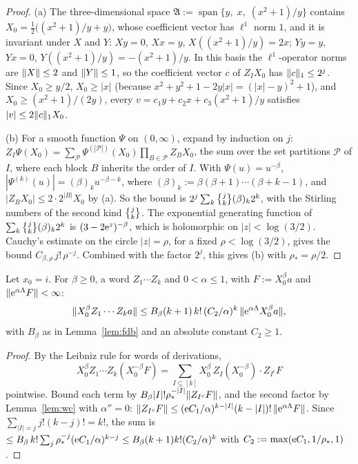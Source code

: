 \begin{proof}
(a) The three-dimensional space $\mathfrak A:=\operatorname{span}\{y,\;x,\;(x^2+1)/y\}$ contains $X_0=\tfrac12\bigl((x^2+1)/y+y\bigr)$,
whose coefficient vector has $\ell^1$ norm $1$, and it is invariant under $X$ and $Y$: $Xy=0$, $Xx=y$, $X((x^2+1)/y)=2x$; $Yy=y$,
$Yx=0$, $Y((x^2+1)/y)=-(x^2+1)/y$. In this basis the $\ell^1$-operator norms are $\lVert X\rVert\le2$ and $\lVert Y\rVert\le1$, so the coefficient
vector $c$ of $Z_IX_0$ has $\lVert c\rVert_1\le2^j$. Since $X_0\ge y/2$, $X_0\ge|x|$ (because $x^2+y^2+1-2y|x|=(|x|-y)^2+1$), and
$X_0\ge(x^2+1)/(2y)$, every $v=c_1y+c_2x+c_3(x^2+1)/y$ satisfies $|v|\le2\lVert c\rVert_1X_0$.

(b) For a smooth function $\Psi$ on $(0,\infty)$, expand by induction on $j$: $Z_I\Psi(X_0)=\sum_{\mathcal P}\Psi^{(|\mathcal P|)}(X_0)\prod_{B\in\mathcal P}Z_BX_0$, the sum over the set partitions $\mathcal P$ of $I$, where each block $B$ inherits the order of $I$.
With $\Psi(u)=u^{-\beta}$, $|\Psi^{(k)}(u)|=(\beta)_ku^{-\beta-k}$, where $(\beta)_k:=\beta(\beta+1)\cdots(\beta+k-1)$, and
$|Z_BX_0|\le2\cdot2^{|B|}X_0$ by (a). So the bound is $2^j\sum_k\stirling jk(\beta)_k2^k$, with the Stirling numbers of the second kind $\stirling jk$.
The exponential generating function of $\sum_k\stirling jk(\beta)_k2^k$ is $(3-2\mathrm{e}^z)^{-\beta}$, which is holomorphic on $|z|<\log(3/2)$.
Cauchy's estimate on the circle $|z|=\rho$, for a fixed $\rho<\log(3/2)$, gives the bound $C_{\beta,\rho}\,j!\,\rho^{-j}$. Combined with the factor $2^j$, this gives (b) with $\rho_*=\rho/2$. \qedhere
\end{proof}

\begin{lemma}\label{lem:sc}
Let $x_0=i$. For $\beta\ge0$, a word $Z_1\cdots Z_k$ and $0<\alpha\le1$, with $F:=X_0^\beta a$ and $\lVert \mathrm{e}^{\alpha\Lambda}F\rVert<\infty$:
\[
\lVert X_0^\beta Z_1\cdots Z_k a\rVert\le B_\beta(k+1)\,k!\,(C_2/\alpha)^k\,\lVert \mathrm{e}^{\alpha\Lambda}X_0^\beta a\rVert,
\]
with $B_\beta$ as in Lemma~\ref{lem:fdb} and an absolute constant $C_2\ge1$.
\end{lemma}

\begin{proof}
By the Leibniz rule for words of derivations,
\[X_0^\beta Z_1\cdots Z_k(X_0^{-\beta}F)=\sum_{I\subseteq[k]}X_0^\beta\,Z_I(X_0^{-\beta})\cdot Z_{I^c}F\]
pointwise. Bound each term by $B_\beta|I|!\rho_*^{-|I|}\lVert Z_{I^c}F\rVert$, and the second factor by Lemma~\ref{lem:wc} with $\alpha''=0$: $\lVert Z_{I^c}F\rVert\le(\mathrm{e} C_1/\alpha)^{k-|I|}(k-|I|)!\,\lVert \mathrm{e}^{\alpha\Lambda}F\rVert$.
Since $\sum_{|I|=j}j!(k-j)!=k!$, the sum is $\le B_\beta\,k!\sum_j\rho_*^{-j}(\mathrm{e} C_1/\alpha)^{k-j}\le B_\beta(k+1)k!(C_2/\alpha)^k$ with
$C_2:=\max(\mathrm{e} C_1,1/\rho_*,1)$. \qedhere
\end{proof}


